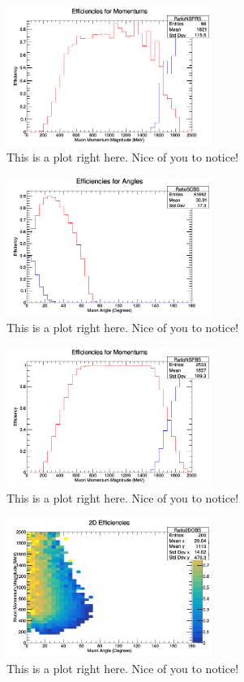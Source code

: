 \documentclass[11pt]{article}
\begin{document}
\begin{figure}[H]
\centering
\includegraphics[width=0.6\textwidth]{NMCombinedPlotsImages/4-NMCombinedPlots.png}
\caption{This is a plot right here. Nice of you to notice!}
\end{figure}

\begin{figure}[H]
\centering
\includegraphics[width=0.6\textwidth]{NMCombinedPlotsImages/5-NMCombinedPlots.png}
\caption{This is a plot right here. Nice of you to notice!}
\end{figure}

\begin{figure}[H]
\centering
\includegraphics[width=0.6\textwidth]{NMCombinedPlotsImages/6-NMCombinedPlots.png}
\caption{This is a plot right here. Nice of you to notice!}
\end{figure}

\begin{figure}[H]
\centering
\includegraphics[width=0.6\textwidth]{NMCombinedPlotsImages/7-NMCombinedPlots.png}
\caption{This is a plot right here. Nice of you to notice!}
\end{figure}
\end{document}
